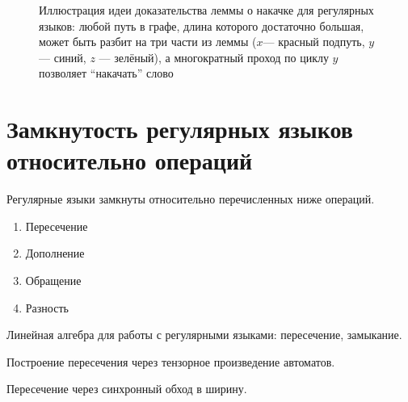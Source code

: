 \begin{figure}
    \begin{center}
    \end{center}
    \caption{Иллюстрация идеи доказательства леммы о накачке для регулярных языков: любой путь в графе, длина которого достаточно большая, может быть разбит на три части из леммы ($x$--- красный подпуть, $y$ --- синий, $z$ --- зелёный), а многократный проход по циклу $y$ позволяет ``накачать'' слово}
    \label{fig:reg_lang_pumping_lemma}
\end{figure}


\section{Замкнутость регулярных языков относительно операций}

\begin{theorem}
    Регулярные языки замкнуты относительно перечисленных ниже операций.
    \begin{enumerate}
        \item Пересечение
        \item Дополнение
        \item Обращение
        \item Разность
    \end{enumerate}
\end{theorem}

Линейная алгебра для работы с регулярными языками: пересечение, замыкание.

Построение пересечения через тензорное произведение автоматов.

Пересечение через синхронный обход в ширину.

%
%
